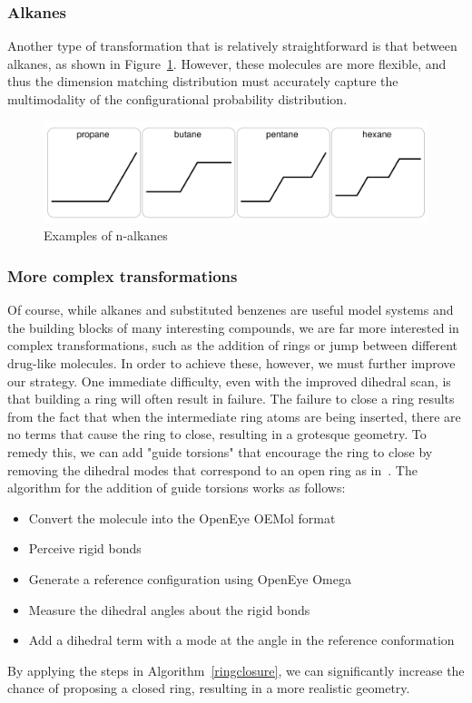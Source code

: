 \subsubsection{Alkanes}
%
Another type of transformation that is relatively straightforward is that between alkanes, as shown in Figure~\ref{fig:n-alkanes}.
%
However, these molecules are more flexible, and thus the dimension matching distribution must accurately capture the multimodality of the configurational probability distribution.
%
\begin{figure}
    \centering
    \includegraphics[width=1.0\textwidth]{alkanes.png}
    \caption{Examples of n-alkanes}
    \label{fig:n-alkanes}
\end{figure}
%
\subsubsection{More complex transformations}
%
Of course, while alkanes and substituted benzenes are useful model systems and the building blocks of many interesting compounds, we are far more interested in complex transformations, such as the addition of rings or jump between different drug-like molecules.
%
In order to achieve these, however, we must further improve our strategy.
%
One immediate difficulty, even with the improved dihedral scan, is that building a ring will often result in failure.
%
The failure to close a ring results from the fact that when the intermediate ring atoms are being inserted, there are no terms that cause the ring to close, resulting in a grotesque geometry.
%
To remedy this, we can add "guide torsions" that encourage the ring to close by removing the dihedral modes that correspond to an open ring as in~\cite{Wick2000}.
%
The algorithm for the addition of guide torsions works as follows:
\begin{itemize} \label{ringclosure}
    \item Convert the molecule into the OpenEye OEMol format
    \item Perceive rigid bonds
    \item Generate a reference configuration using OpenEye Omega
    \item Measure the dihedral angles about the rigid bonds
    \item Add a dihedral term with a mode at the angle in the reference conformation
\end{itemize}
%
By applying the steps in Algorithm~\ref{ringclosure}, we can significantly increase the chance of proposing a closed ring, resulting in a more realistic geometry.
%
